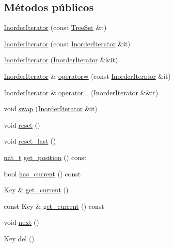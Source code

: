 \subsection*{Métodos públicos}
\begin{DoxyCompactItemize}
\item 
\hyperlink{class_designar_1_1_tree_set_1_1_inorder_iterator_ad5ff37d7f6ed8284dc3ce396cbdc4f86}{Inorder\+Iterator} (const \hyperlink{class_designar_1_1_tree_set}{Tree\+Set} \&t)
\item 
\hyperlink{class_designar_1_1_tree_set_1_1_inorder_iterator_a010cfd17e2ad8031981ea3688f89f545}{Inorder\+Iterator} (const \hyperlink{class_designar_1_1_tree_set_1_1_inorder_iterator}{Inorder\+Iterator} \&it)
\item 
\hyperlink{class_designar_1_1_tree_set_1_1_inorder_iterator_aa4b81ce7770abb8f488099fd5abb1a02}{Inorder\+Iterator} (\hyperlink{class_designar_1_1_tree_set_1_1_inorder_iterator}{Inorder\+Iterator} \&\&it)
\item 
\hyperlink{class_designar_1_1_tree_set_1_1_inorder_iterator}{Inorder\+Iterator} \& \hyperlink{class_designar_1_1_tree_set_1_1_inorder_iterator_a4eca124737c8f5664deafc3b19f17e46}{operator=} (const \hyperlink{class_designar_1_1_tree_set_1_1_inorder_iterator}{Inorder\+Iterator} \&it)
\item 
\hyperlink{class_designar_1_1_tree_set_1_1_inorder_iterator}{Inorder\+Iterator} \& \hyperlink{class_designar_1_1_tree_set_1_1_inorder_iterator_a2b0a20a5a81ee8d54929a035df77e95c}{operator=} (\hyperlink{class_designar_1_1_tree_set_1_1_inorder_iterator}{Inorder\+Iterator} \&\&it)
\item 
void \hyperlink{class_designar_1_1_tree_set_1_1_inorder_iterator_ac3d6fc72f50addc10c0c99b533448a9a}{swap} (\hyperlink{class_designar_1_1_tree_set_1_1_inorder_iterator}{Inorder\+Iterator} \&it)
\item 
void \hyperlink{class_designar_1_1_tree_set_1_1_inorder_iterator_a7a5ce683413135445a1d7a064ae7d70c}{reset} ()
\item 
void \hyperlink{class_designar_1_1_tree_set_1_1_inorder_iterator_ae6a74511239f69caf43e92f915f8c605}{reset\+\_\+last} ()
\item 
\hyperlink{namespace_designar_aa72662848b9f4815e7bf31a7cf3e33d1}{nat\+\_\+t} \hyperlink{class_designar_1_1_tree_set_1_1_inorder_iterator_a32fceb8d4318ee6c11c07c1b02b93635}{get\+\_\+position} () const
\item 
bool \hyperlink{class_designar_1_1_tree_set_1_1_inorder_iterator_ae83dae23b6d48b2ccec38c7e22d01fd0}{has\+\_\+current} () const
\item 
Key \& \hyperlink{class_designar_1_1_tree_set_1_1_inorder_iterator_a48d0738cf18aa20c4a6161841324443d}{get\+\_\+current} ()
\item 
const Key \& \hyperlink{class_designar_1_1_tree_set_1_1_inorder_iterator_aad3ec85d58308071d6589fdbb258bdf6}{get\+\_\+current} () const
\item 
void \hyperlink{class_designar_1_1_tree_set_1_1_inorder_iterator_a850f1ca2e5a49dc43fddc09e2cc43659}{next} ()
\item 
Key \hyperlink{class_designar_1_1_tree_set_1_1_inorder_iterator_a137c29da7611999490f4a10a898b3c1d}{del} ()
\end{DoxyCompactItemize}
